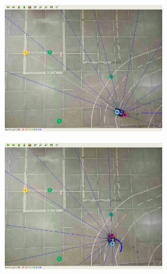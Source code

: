 \begin{figure}[H]
\begin{center}
    \begin{subfigure}[b]{0.60\textwidth}
        \begin{subfigure}[b]{0.24\textwidth}
            \includegraphics[width=\textwidth]{imagens/real_envs/real_env1_sac/1.png}
        \end{subfigure}
        \hfill
        \begin{subfigure}[b]{0.24\textwidth}
            \includegraphics[width=\textwidth]{imagens/real_envs/real_env1_sac/2.png}
        \end{subfigure}
        \hfill
        \begin{subfigure}[b]{0.24\textwidth}

\end{subfigure}
\end{subfigure}
\end{center}
\end{figure}
